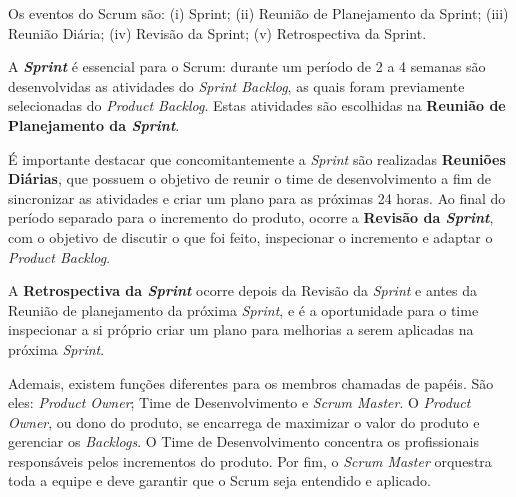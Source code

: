 Os eventos do Scrum são: (i) Sprint; (ii) Reunião de Planejamento da Sprint; (iii) Reunião Diária; (iv) Revisão da Sprint; (v) Retrospectiva da Sprint.

A \textbf{\textit{Sprint}} é essencial para o Scrum: durante um período de 2 a 4 semanas são desenvolvidas as atividades do \textit{Sprint Backlog}, as quais foram previamente selecionadas do \textit{Product Backlog}. Estas atividades são escolhidas na \textbf{Reunião de Planejamento da \textit{Sprint}}. 

É importante destacar que concomitantemente a \textit{Sprint} são realizadas \textbf{Reuniões Diárias}, que possuem o objetivo de reunir o time de desenvolvimento a fim de sincronizar as atividades e criar um plano para as próximas 24 horas. Ao final do período separado para o incremento do produto, ocorre a \textbf{Revisão da \textit{Sprint}}, com o objetivo de discutir o que foi feito, inspecionar o incremento e adaptar o \textit{Product Backlog}. 

A \textbf{Retrospectiva da \textit{Sprint}} ocorre depois da Revisão da \textit{Sprint} e antes da Reunião de planejamento da próxima \textit{Sprint}, e é a oportunidade para o time inspecionar a si próprio criar um plano para melhorias a serem aplicadas na próxima \textit{Sprint}.

Ademais, existem funções diferentes para os membros chamadas de papéis. São eles: \textit{Product Owner}; Time de Desenvolvimento e \textit{Scrum Master}. 
O \textit{Product Owner}, ou dono do produto, se encarrega de maximizar o valor do produto e gerenciar os \textit{Backlogs}. O Time de Desenvolvimento concentra os profissionais responsáveis pelos incrementos do produto. Por fim, o \textit{Scrum Master} orquestra toda a equipe e deve garantir que o Scrum seja entendido e aplicado.


